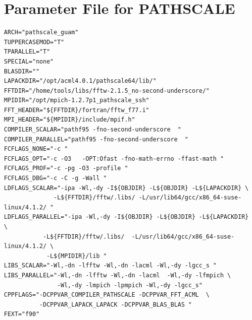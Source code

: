 \documentclass[a4paper,10pt]{report}
\begin{document}
\newpage
\section{Parameter File for PATHSCALE}
\begin{verbatim}
ARCH="pathscale_guam"
TUPPERCASEMOD="T"
TPARALLEL="T"
SPECIAL="none"
BLASDIR=""
LAPACKDIR="/opt/acml4.0.1/pathscale64/lib/"
FFTDIR="/home/tools/libs/fftw-2.1.5_no-second-underscore/"
MPIDIR="/opt/mpich-1.2.7p1_pathscale_ssh"
FFT_HEADER="${FFTDIR}/fortran/fftw_f77.i"
MPI_HEADER="${MPIDIR}/include/mpif.h"
COMPILER_SCALAR="pathf95 -fno-second-underscore  "
COMPILER_PARALLEL="pathf95 -fno-second-underscore  "
FCFLAGS_NONE="-c "
FCFLAGS_OPT="-c -O3   -OPT:Ofast -fno-math-errno -ffast-math "
FCFLAGS_PROF="-c -pg -O3 -profile "
FCFLAGS_DBG="-c -C -g -Wall "
LDFLAGS_SCALAR="-ipa -Wl,-dy -I${OBJDIR} -L${OBJDIR} -L${LAPACKDIR} \
              -L${FFTDIR}/fftw/.libs/ -L/usr/lib64/gcc/x86_64-suse-linux/4.1.2/ "
LDFLAGS_PARALLEL="-ipa -Wl,-dy -I${OBJDIR} -L${OBJDIR} -L${LAPACKDIR} \
           -L${FFTDIR}/fftw/.libs/  -L/usr/lib64/gcc/x86_64-suse-linux/4.1.2/ \
            -L${MPIDIR}/lib "
LIBS_SCALAR="-Wl,-dn -lfftw -Wl,-dn -lacml -Wl,-dy -lgcc_s "
LIBS_PARALLEL="-Wl,-dn -lfftw -Wl,-dn -lacml  -Wl,-dy -lfmpich \
               -Wl,-dy -lmpich -lpmpich -Wl,-dy -lgcc_s"
CPPFLAGS="-DCPPVAR_COMPILER_PATHSCALE -DCPPVAR_FFT_ACML  \
          -DCPPVAR_LAPACK_LAPACK -DCPPVAR_BLAS_BLAS "
FEXT="f90"
\end{verbatim}

\newpage
\end{document}
